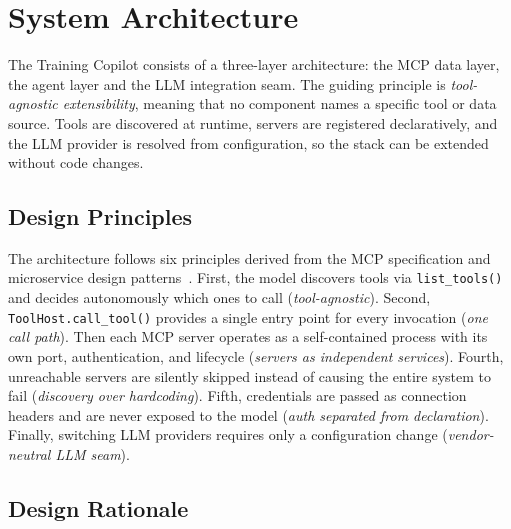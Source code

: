 \section{System Architecture}\label{sec:architecture}

The Training Copilot consists of a three-layer architecture: the MCP data layer, the agent layer and the LLM integration seam. The guiding principle is \textit{tool-agnostic extensibility}, meaning that no component names a specific tool or data source. Tools are discovered at runtime, servers are registered declaratively, and the LLM provider is resolved from configuration, so the stack can be extended without code changes.

\subsection{Design Principles}\label{sec:architecture:principles}

The architecture follows six principles derived from the MCP specification and microservice design patterns~\citep{dragoni_microservices_2017}. First, the model discovers tools via \texttt{list\_tools()} and decides autonomously which ones to call (\textit{tool-agnostic}). Second, \texttt{ToolHost.call\_tool()} provides a single entry point for every invocation (\textit{one call path}). Then each MCP server operates as a self-contained process with its own port, authentication, and lifecycle (\textit{servers as independent services}). Fourth, unreachable servers are silently skipped instead of causing the entire system to fail (\textit{discovery over hardcoding}). Fifth, credentials are passed as connection headers and are never exposed to the model (\textit{auth separated from declaration}). Finally, switching LLM providers requires only a configuration change (\textit{vendor-neutral LLM seam}).

\subsection{Design Rationale}\label{sec:architecture:rationale}

